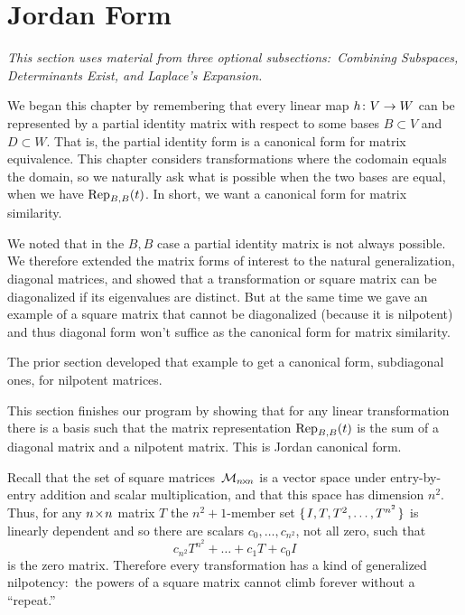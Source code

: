 \section{Jordan Form}
\noindent\textit{This section uses material from three optional
subsections:~Combining Subspaces, Determinants Exist, and
Laplace's Expansion.}

We began this chapter
by remembering that every linear map $\map{h}{V}{W}$ can
be represented by a partial identity matrix with respect to some
bases $B\subset V$ and $D\subset W$.
That is, the partial identity form is a canonical form for 
matrix equivalence. 
This chapter considers transformations where
the codomain equals the domain, so 
we naturally ask what is possible when the
two bases are equal, when we have $\rep{t}{B,B}$.
In short, we want a canonical form for matrix similarity.

We noted that in the $B,B$ case
a partial identity matrix is not always possible.
We therefore extended the matrix 
forms of interest to the natural generalization, 
diagonal matrices, and
showed that a transformation or square matrix can be diagonalized
if its eigenvalues are distinct.
But at the same time we gave an example of a 
square matrix that cannot be diagonalized
(because it is nilpotent)
and thus diagonal form won't suffice as the canonical form 
for matrix similarity. 

The prior section developed that example
to get a canonical form, subdiagonal ones, for nilpotent matrices.

This section finishes our program by
showing that for any linear transformation there is
a basis such that the matrix representation $\rep{t}{B,B}$ is the sum of a 
diagonal matrix and a nilpotent matrix.
This is Jordan canonical form.









Recall that the set of square matrices~\( \matspace_{\nbyn{n}} \)
is a vector space under entry-by-entry addition and scalar multiplication,
and that 
this space has dimension \( n^2 \).
Thus, for any \( \nbyn{n} \) matrix $T$ the
\( n^2+1 \)-member set \( \set{I,T,T^2,\dots,T^{n^2} } \) is linearly
dependent and so there are scalars \( c_0,\dots,c_{n^2} \),
not all zero, such that
\begin{equation*}
  c_{n^2}T^{n^2}+\dots+c_1T+c_0I
\end{equation*}
is the zero matrix.
Therefore every transformation has a kind of generalized 
nilpotency:~the powers
of a square matrix cannot climb forever without a ``repeat.''

